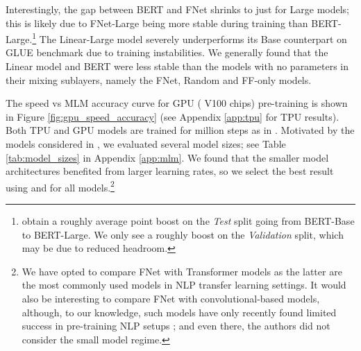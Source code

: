 \documentclass[11pt]{article}
\begin{document}
Interestingly, the gap between BERT and FNet shrinks to just  for Large models; this is likely due to FNet-Large being more stable during training than BERT-Large.\footnote{\citet{devlin2018bert} obtain a roughly  average point boost on the \emph{Test} split going from BERT-Base to BERT-Large. We only see a roughly  boost on the \emph{Validation} split, which may be due to reduced headroom.} The Linear-Large model severely underperforms its Base counterpart on GLUE benchmark due to training instabilities. We generally found that the Linear model and BERT were less stable than the models with no parameters in their mixing sublayers, namely the FNet, Random and FF-only models.

The speed vs MLM accuracy curve for GPU ( V100 chips) pre-training is shown in Figure \ref{fig:gpu_speed_accuracy} (see Appendix \ref{app:tpu} for TPU results). Both TPU and GPU models are trained for  million steps as in \citet{devlin2018bert}. Motivated by the models considered in \citet{turc2019well}, we evaluated several model sizes; see Table \ref{tab:model_sizes} in Appendix \ref{app:mlm}. We found that the smaller model architectures benefited from larger learning rates, so we select the best result using  and  for all models.\footnote{We have opted to compare FNet with Transformer models as the latter are the most commonly used models in NLP transfer learning settings. It would also be interesting to compare FNet with convolutional-based models, although, to our knowledge, such models have only recently found limited success in pre-training NLP setups \citep{tay2021pre}; and even there, the authors did not consider the small model regime.}
\end{document}
